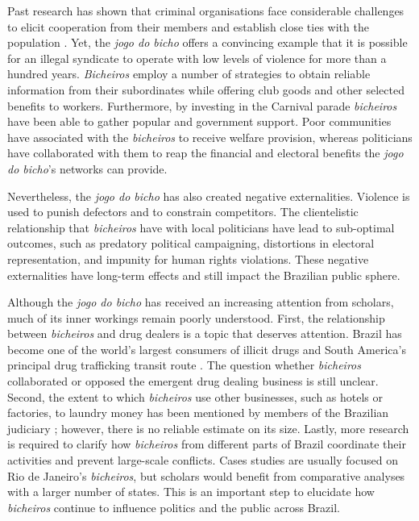 \documentclass[a4paper,12pt]{article}
\begin{document}
Past research has shown that criminal organisations face considerable challenges to elicit cooperation from their members and establish close ties with the population \citep[e.g.][]{gambetta1996sicilian,skarbek2011governance,skarbek2012prison,varese2001russian,varese2011mafias}. Yet, the \textit{jogo do bicho} offers a convincing example that it is possible for an illegal syndicate to operate with low levels of violence for more than a hundred years. \textit{Bicheiros} employ a number of strategies to obtain reliable information from their subordinates while offering club goods and other selected benefits to workers. Furthermore, by investing in the Carnival parade \textit{bicheiros} have been able to gather popular and government support. Poor communities have associated with the \textit{bicheiros} to receive welfare provision, whereas politicians have collaborated with them to reap the financial and electoral benefits the \textit{jogo do bicho}'s networks can provide.

Nevertheless, the \textit{jogo do bicho} has also created negative externalities. Violence is used to punish defectors and to constrain competitors. The clientelistic relationship that \textit{bicheiros} have with local politicians have lead to sub-optimal outcomes, such as predatory political campaigning, distortions in electoral representation, and impunity for human rights violations. These negative externalities have long-term effects and still impact the Brazilian public sphere.

Although the \textit{jogo do bicho} has received an increasing attention from scholars, much of its inner workings remain poorly understood. First, the relationship between \textit{bicheiros} and drug dealers is a topic that deserves attention. Brazil has become one of the world's largest consumers of illicit drugs and South America's principal drug trafficking transit route \citep{miraglia2015drugs,misse2011crime}. The question whether \textit{bicheiros} collaborated or opposed the emergent drug dealing business is still unclear. Second, the extent to which \textit{bicheiros} use other businesses, such as hotels or factories, to laundry money has been mentioned by members of the Brazilian judiciary \citep{globo2012bicheiro,globo2015cacaniquel}; however, there is no reliable estimate on its size. Lastly, more research is required to clarify how \textit{bicheiros} from different parts of Brazil coordinate their activities and prevent large-scale conflicts. Cases studies are usually focused on Rio de Janeiro's \textit{bicheiros}, but scholars would benefit from comparative analyses with a larger number of states. This is an important step to elucidate how \textit{bicheiros} continue to influence politics and the public across Brazil.

\newpage


\end{document}
